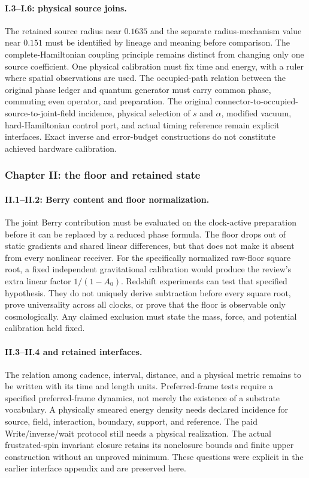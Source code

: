 \paragraph{I.3--I.6: physical source joins.}
The retained source radius near $0.1635$ and the separate radius-mechanism value near $0.151$ must be identified by lineage and meaning before comparison. The complete-Hamiltonian coupling principle remains distinct from changing only one source coefficient. One physical calibration must fix time and energy, with a ruler where spatial observations are used. The occupied-path relation between the original phase ledger and quantum generator must carry common phase, commuting even operator, and preparation. The original connector-to-occupied-source-to-joint-field incidence, physical selection of $s$ and $\alpha$, modified vacuum, hard-Hamiltonian control port, and actual timing reference remain explicit interfaces. Exact inverse and error-budget constructions do not constitute achieved hardware calibration.

\subsubsection*{Chapter II: the floor and retained state}

\paragraph{II.1--II.2: Berry content and floor normalization.}
The joint Berry contribution must be evaluated on the clock-active preparation before it can be replaced by a reduced phase formula. The floor drops out of static gradients and shared linear differences, but that does not make it absent from every nonlinear receiver. For the specifically normalized raw-floor square root, a fixed independent gravitational calibration would produce the review's extra linear factor $1/(1-A_0)$. Redshift experiments can test that specified hypothesis. They do not uniquely derive subtraction before every square root, prove universality across all clocks, or prove that the floor is observable only cosmologically. Any claimed exclusion must state the mass, force, and potential calibration held fixed.

\paragraph{II.3--II.4 and retained interfaces.}
The relation among cadence, interval, distance, and a physical metric remains to be written with its time and length units. Preferred-frame tests require a specified preferred-frame dynamics, not merely the existence of a substrate vocabulary. A physically smeared energy density needs declared incidence for source, field, interaction, boundary, support, and reference. The paid Write/inverse/wait protocol still needs a physical realization. The actual frustrated-spin invariant closure retains its nonclosure bounds and finite upper construction without an unproved minimum. These questions were explicit in the earlier interface appendix and are preserved here.

